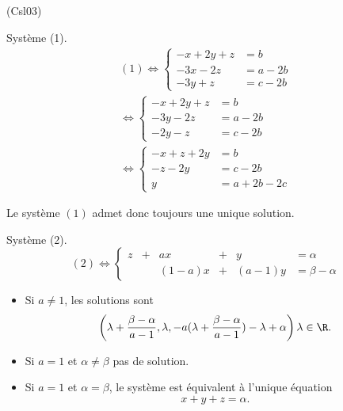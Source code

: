 \begin{tiny}(Csl03)\end{tiny}
Système (1).
\begin{multline*}
  (1)\Leftrightarrow
\left\lbrace 
\begin{aligned}
  -x+2y+z &= b \\
  -3x -2z &= a-2b \\
  -3y+z &= c-2b
\end{aligned}
\right.\\
\Leftrightarrow
\left\lbrace 
\begin{aligned}
  -x+2y+z &= b \\
  -3y -2z &= a-2b \\
  -2y-z &= c-2b
\end{aligned}
\right.\\
\Leftrightarrow
\left\lbrace 
\begin{aligned}
  -x+z+2y &= b  \\
  -z-2y &= c-2b\\
  y &=a+2b-2c
\end{aligned}
\right.
\end{multline*}

Le système $(1)$ admet donc toujours une unique solution.

Système (2).
\begin{displaymath}
  (2)\Leftrightarrow 
\left\lbrace 
\begin{alignedat}{4}
  z & + & ax    & + & y      &= \alpha \\
    &   &(1-a)x & + & (a-1)y &= \beta -\alpha
\end{alignedat}
\right.
\end{displaymath}
\begin{itemize}
  \item Si $a\neq 1$, les solutions sont
\begin{displaymath}
  \left( \lambda + \frac{\beta - \alpha}{a-1}, \lambda, -a(\lambda + \frac{\beta - \alpha}{a-1})-\lambda + \alpha \right) \lambda \in \R.
\end{displaymath}
  \item Si $a=1$ et $\alpha \neq \beta$ pas de solution.
  \item Si $a=1$ et $\alpha = \beta$, le système est équivalent à l'unique équation
\[
  x+y+z=\alpha.
\]
\end{itemize}

